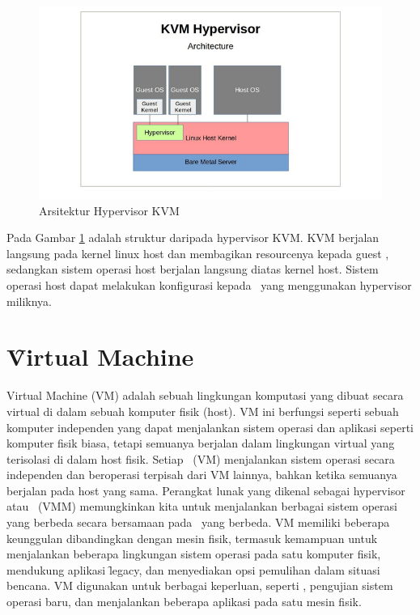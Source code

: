 \begin{figure}
	\centering
	\includegraphics[width=1\textwidth]
	{assets/pics/xen-kvm.png}
	\caption{Arsitektur Hypervisor KVM}
	\label{fig:xen-kvm}
\end{figure}

Pada Gambar \ref{fig:xen-kvm} adalah struktur daripada hypervisor KVM. KVM berjalan langsung pada kernel linux host dan membagikan resourcenya kepada guest \vm, sedangkan sistem operasi host berjalan langsung diatas kernel host. Sistem operasi host dapat melakukan konfigurasi kepada \vm\ yang menggunakan hypervisor miliknya.

\section{\f{Virtual Machine}}

Virtual Machine (VM) adalah sebuah lingkungan komputasi yang dibuat secara virtual di dalam sebuah komputer fisik (host)\cite{Pradilla2016}. VM ini berfungsi seperti sebuah komputer independen yang dapat menjalankan sistem operasi dan aplikasi seperti komputer fisik biasa, tetapi semuanya berjalan dalam lingkungan virtual yang terisolasi di dalam host fisik. Setiap \vm\ (VM) menjalankan sistem operasi secara independen dan beroperasi terpisah dari VM lainnya, bahkan ketika semuanya berjalan pada host yang sama. Perangkat lunak yang dikenal sebagai hypervisor atau \vmm\ (VMM) memungkinkan kita untuk menjalankan berbagai sistem operasi yang berbeda secara bersamaan pada \vm\ yang berbeda. VM memiliki beberapa keunggulan dibandingkan dengan mesin fisik, termasuk kemampuan untuk menjalankan beberapa lingkungan sistem operasi pada satu komputer fisik, mendukung aplikasi \f{legacy}, dan menyediakan opsi pemulihan dalam situasi bencana. VM digunakan untuk berbagai keperluan, seperti \cc, pengujian sistem operasi baru, dan menjalankan beberapa aplikasi pada satu mesin fisik\cite{ibmWhatVirtualMachine}.

